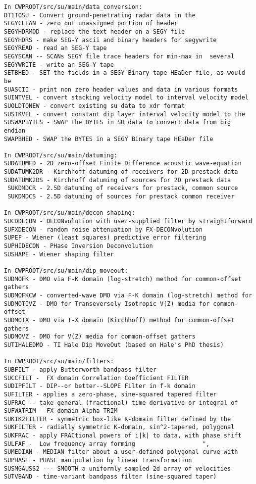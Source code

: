 {\begin{verbatim}
In CWPROOT/src/su/main/data_conversion:
DT1TOSU - Convert ground-penetrating radar data in the	
SEGYCLEAN - zero out unassigned portion of header		
SEGYHDRMOD - replace the text header on a SEGY file		
SEGYHDRS - make SEG-Y ascii and binary headers for segywrite		
SEGYREAD - read an SEG-Y tape						
SEGYSCAN -- SCANs SEGY file trace headers for min-max in  several	
SEGYWRITE - write an SEG-Y tape					
SETBHED - SET the fields in a SEGY Binary tape HEaDer file, as would be
SUASCII - print non zero header values and data in various formats    
SUINTVEL - convert stacking velocity model to interval velocity model	
SUOLDTONEW - convert existing su data to xdr format		
SUSTKVEL - convert constant dip layer interval velocity model to the	
SUSWAPBYTES - SWAP the BYTES in SU data to convert data from big endian
SWAPBHED - SWAP the BYTES in a SEGY Binary tape HEaDer file		

In CWPROOT/src/su/main/datuming:
SUDATUMFD - 2D zero-offset Finite Difference acoustic wave-equation	
SUDATUMK2DR - Kirchhoff datuming of receivers for 2D prestack data	
SUDATUMK2DS - Kirchhoff datuming of sources for 2D prestack data	
 SUKDMDCR - 2.5D datuming of receivers for prestack, common source    
 SUKDMDCS - 2.5D datuming of sources for prestack common receiver 	

In CWPROOT/src/su/main/decon_shaping:
SUCDDECON - DECONvolution with user-supplied filter by straightforward
SUFXDECON - random noise attenuation by FX-DECONvolution              
SUPEF - Wiener (least squares) predictive error filtering		
SUPHIDECON - PHase Inversion Deconvolution				
SUSHAPE - Wiener shaping filter					

In CWPROOT/src/su/main/dip_moveout:
SUDMOFK - DMO via F-K domain (log-stretch) method for common-offset gathers
SUDMOFKCW - converted-wave DMO via F-K domain (log-stretch) method for
SUDMOTIVZ - DMO for Transeversely Isotropic V(Z) media for common-offset
SUDMOTX - DMO via T-X domain (Kirchhoff) method for common-offset gathers
SUDMOVZ - DMO for V(Z) media for common-offset gathers		
SUTIHALEDMO - TI Hale Dip MoveOut (based on Hale's PhD thesis)	

In CWPROOT/src/su/main/filters:
SUBFILT - apply Butterworth bandpass filter 			
SUCCFILT -  FX domain Correlation Coefficient FILTER			
SUDIPFILT - DIP--or better--SLOPE Filter in f-k domain	
SUFILTER - applies a zero-phase, sine-squared tapered filter		
SUFRAC -- take general (fractional) time derivative or integral of	
SUFWATRIM - FX domain Alpha TRIM					
SUK1K2FILTER - symmetric box-like K-domain filter defined by the	
SUKFILTER - radially symmetric K-domain, sin^2-tapered, polygonal	
SUKFRAC - apply FRACtional powers of i|k| to data, with phase shift 
SULFAF -  Low frequency array forming					", 
SUMEDIAN - MEDIAN filter about a user-defined polygonal curve with	
SUPHASE - PHASE manipulation by linear transformation			
SUSMGAUSS2 --- SMOOTH a uniformly sampled 2d array of velocities	
SUTVBAND - time-variant bandpass filter (sine-squared taper)  


\end{verbatim}}
